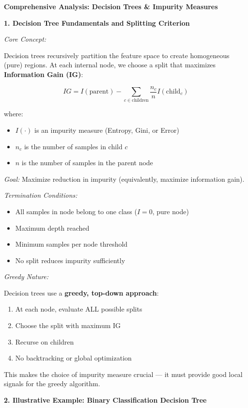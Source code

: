 \documentclass[12pt]{article}
\begin{document}
\begin{explanation}
\textbf{Comprehensive Analysis: Decision Trees \& Impurity Measures}

\textbf{1. Decision Tree Fundamentals and Splitting Criterion}

\textit{Core Concept:}

Decision trees recursively partition the feature space to create homogeneous (pure) regions. At each internal node, we choose a split that maximizes \textbf{Information Gain (IG)}:

\[
IG = I(\text{parent}) - \sum_{c \in \text{children}} \frac{n_c}{n} I(\text{child}_c)
\]

where:
\begin{itemize}
    \item $I(\cdot)$ is an impurity measure (Entropy, Gini, or Error)
    \item $n_c$ is the number of samples in child $c$
    \item $n$ is the number of samples in the parent node
\end{itemize}

\textit{Goal:} Maximize reduction in impurity (equivalently, maximize information gain).

\textit{Termination Conditions:}
\begin{itemize}
    \item All samples in node belong to one class ($I = 0$, pure node)
    \item Maximum depth reached
    \item Minimum samples per node threshold
    \item No split reduces impurity sufficiently
\end{itemize}

\textit{Greedy Nature:}

Decision trees use a \textbf{greedy, top-down approach}:
\begin{enumerate}
    \item At each node, evaluate ALL possible splits
    \item Choose the split with maximum IG
    \item Recurse on children
    \item No backtracking or global optimization
\end{enumerate}

This makes the choice of impurity measure crucial — it must provide good local signals for the greedy algorithm.

\textbf{2. Illustrative Example: Binary Classification Decision Tree}


\end{explanation}
\end{document}
